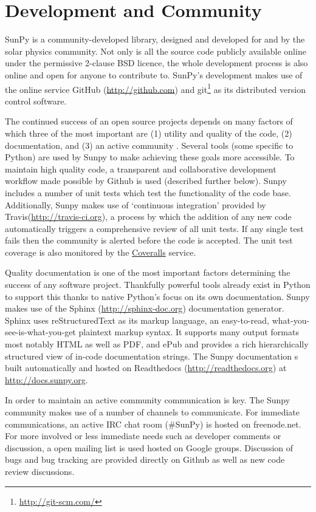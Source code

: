 \section{Development and Community}
SunPy is a community-developed library, designed and developed for and by 
the solar physics community. Not only is all the source code publicly available 
online under the permissive 2-clause BSD licence, the whole 
development 
process is also online and open for anyone to contribute to.
SunPy's development makes use of the online 
service GitHub (\url{http://github.com}) and git\footnote{\url{http://git-scm.com/}}
as its distributed version control software. 

The continued success of an open source projects depends on many factors of which 
three of the most important are (1) utility and quality of the code, (2) documentation, and (3) an
active community \cite{bangerth2013}. Several tools (some specific to Python) are used by
Sunpy to make achieving these goals more accessible. To maintain high quality code, a 
transparent and collaborative development workflow made possible by Github is used (described
further below). Sunpy includes a number of unit tests which test the functionality 
of the code base. Additionally, Sunpy makes use of `continuous integration' provided by
Travis(\url{http://travis-ci.org}), a process by which the addition of any new code 
automatically triggers a comprehensive review of all unit tests. If any single test
fails then the community is alerted before the code is accepted. The unit test coverage is
also monitored by the \href{http://coveralls.io}{Coveralls} service.

Quality documentation is
one of the most important factors determining the success of any software project. 
Thankfully powerful tools already exist in Python to support this thanks to native
Python's focus on its own documentation. Sunpy makes use of the Sphinx (\url{http://sphinx-doc.org})
documentation generator. Sphinx uses reStructuredText as its markup language, 
an easy-to-read, what-you-see-is-what-you-get plaintext markup syntax. It supports
many output formats most notably HTML as well as PDF, and ePub and provides a rich
hierarchically structured view of in-code documentation strings. The Sunpy documentation 
s built automatically and hosted on Readthedocs (\url{http://readthedocs.org})
at \url{http://docs.sunpy.org}. 

In order to maintain an active community communication is key.  The Sunpy community makes
use of a number of channels to communicate. For immediate communications, an active IRC chat
room (\#SunPy) is hosted on freenode.net. For more involved or less immediate needs such as
developer comments or discussion, a open mailing list is used hosted on Google groups. 
Discussion of bugs and bug tracking are provided directly on Github as well as new code
review discussions.

